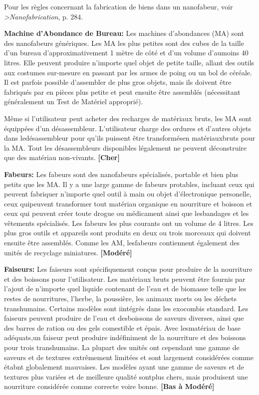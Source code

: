 Pour les règles concernant la fabrication de biens dans un nanofabeur, voir \textit{>Nanofabrication}, p. 284. 

\textbf{Machine d'Abondance de Bureau:} Les machines d'abondances (MA) sont des nanofabeurs génériques. Les MA les plus petites sont des cubes de la taille d'un bureau d'approximativement 1 mètre de côté et d'un volume d'aumoins 40 litres. Elle peuvent produire n'importe quel objet de petite taille, allant des outils aux costumes sur-mesure en passant par les armes de poing ou un bol de céréale. Il est parfois possible d'assembler de plus gros objets, mais ils doivent être fabriqués par en pièces plus petite et peut ensuite être assemblés (nécessitant généralement un Test de Matériel approprié). 

Même si l'utilisateur peut acheter des recharges de matériaux bruts, les MA sont équippées d'un désassembleur. L'utilisateur charge des ordures et d'autres objets dans ledésassembleur pour qu'ils puissent être transformésen matériauxbruts pour la MA. Tout les désassembleurs disponibles légalement ne peuvent déconstruire que des matériau non-vivants. \textbf{[Cher]} 

\textbf{Fabeurs:} Les fabeurs sont des nanofabeurs spécialisés, portable et bien plus petits que les MA. Il y a une large gamme de fabeurs protables, incluant ceux qui peuvent fabriquer n'importe quel outil à main ou objet d'électronique personelle, ceux quipeuvent transformer tout matériau organique en nourriture et boisson et ceux qui peuvent créer toute drogue ou médicament ainsi que lesbandages et les vêtements spécialisés. Les fabeurs les plus courants ont un volume de 4 litres. Les plus gros outils et appareils sont produits en deux ou trois morceaux qui doivent ensuite être assemblés. Comme les AM, lesfabeurs contiennent également des unités de recyclage miniatures. \textbf{[Modéré]} 

\textbf{Faiseurs:} Les faiseurs sont spécifiquement conçus pour produire de la nourriture et des boissons pour l'utilisateur. Les matériaux bruts peuvent être fournis par l'ajout de n'importe quel liquide contenant de l'eau et de biomasse telle que les restes de nourritures, l'herbe, la poussière, les animaux morts ou les déchets transhumains. Certains modèles sont iintégrés dans les exocombis standard. Les faiseurs peuvent produire de l'eau et desboissons de saveurs diverses, ainsi que des barres de ration ou des gels comestible et épais. Avec lesmatériau de base adéquats,un faiseur peut produire indéfiniment de la nourriture et des boissons pour trois transhumains. La plupart des unités ont cependant une gamme de saveurs et de textures extrêmement limitées et sont largement considérées comme étabnt globalement mauvaises. Les modèles ayant une gamme de saveurs et de textures plus variées et de meilleure qualité sontplus chers, mais produisent une nourriture considérée comme correcte voire bonne. \textbf{[Bas à Modéré]} 

